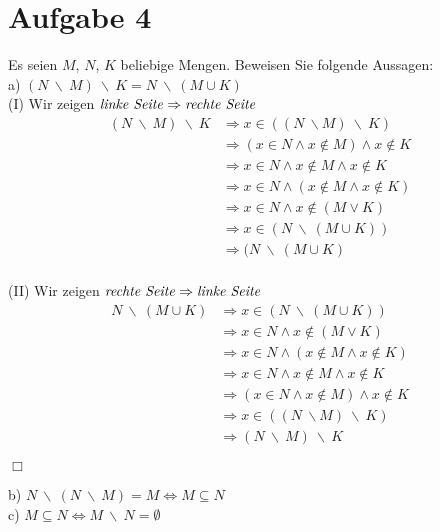 \section*{Aufgabe 4}

Es seien $M$, $N$, $K$ beliebige Mengen. Beweisen Sie folgende Aussagen:\\

a) $(N \ \backslash \ M) \ \backslash \ K = N \ \backslash \ (M \cup K)$\\

(I) Wir zeigen $\text{\textit{linke Seite}} \Rightarrow \text{\textit{rechte Seite}}$
\begin{align*}
(N \ \backslash \ M) \ \backslash \ K &\Rightarrow x \in ((N \ \backslash M) \ \backslash \ K)\\
&\Rightarrow (x \in N \land x \not \in M) \land x \not \in K\\
&\Rightarrow x \in N \land x \not \in M \land x \not \in K\\
&\Rightarrow x \in N \land (x \not \in M \land x \not \in K)\\
&\Rightarrow x \in N \land x \not \in (M \lor K)\\
&\Rightarrow x \in (N \ \backslash \ (M \cup K))\\
&\Rightarrow (N \ \backslash \ (M \cup K)\\
\end{align*}

(II) Wir zeigen $\text{\textit{rechte Seite}} \Rightarrow \text{\textit{linke Seite}}$
\begin{align*}
N \ \backslash \ (M \cup K) &\Rightarrow x \in (N \ \backslash \ (M \cup K))\\
&\Rightarrow x \in N \land x \not \in (M \lor K)\\
&\Rightarrow x \in N \land (x \not \in M \land x \not \in K)\\
&\Rightarrow x \in N \land x \not \in M \land x \not \in K\\
&\Rightarrow (x \in N \land x \not \in M) \land x \not \in K\\
&\Rightarrow x \in ((N \ \backslash M) \ \backslash \ K)\\
&\Rightarrow (N \ \backslash \ M) \ \backslash \ K
\end{align*}

\begin{FlushRight}
$\Box$
\end{FlushRight}

b) $N \ \backslash \ (N \ \backslash \ M) = M \Leftrightarrow M \subseteq N$\\

c) $M \subseteq N \Leftrightarrow M \ \backslash \ N = \emptyset$

\newpage